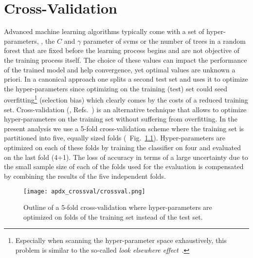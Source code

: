 \chapter{Cross-Validation}
\label{chap:crossval}
Advanced machine learning algorithms typically come with a set of hyper-parameters, \eg{}, the $C$ and $\gamma$ parameter of \glspl{svm} or the number of trees in a random forest that are fixed before the learning process begins and are not objective of the training process itself.
The choice of these values can impact the performance of the trained model and help convergence, yet optimal values are unknown a priori. 
In a canonical approach one splits a second test set and uses it to optimize the hyper-parameters since optimizing on the training (test) set could seed overfitting\footnote{Especially when scanning the hyper-parameter space exhaustively, this problem is similar to the so-called \textit{look elsewhere effect}~\cite{lookelsewhere}.} (selection bias) which clearly comes by the costs of a reduced training set.
Cross-validation (\eg{}, Refs.~\cite{crossval1,crossval2}) is an alternative technique that allows to optimize hyper-parameters on the training set without suffering from overfitting.
In the present analysis we use a 5-fold cross-validation scheme where the training set is partitioned into five, equally sized folds (\cf{}~Fig.~\ref{fig:apdx_crossval}).
Hyper-parameters are optimized on each of these folds by training the classifier on four and evaluated on the last fold (4+1).
The loss of accuracy in terms of a large uncertainty due to the small sample size of each of the folds used for the evaluation is compensated by combining the results of the five independent folds.
\begin{figure}[htbp]
    \centering
    \texttt{[image: apdx\_crossval/crossval.png]}
    \caption{Outline of a 5-fold cross-validation where hyper-parameters are optimized on folds of the training set instead of the test set.}
    \label{fig:apdx_crossval}
\end{figure}

